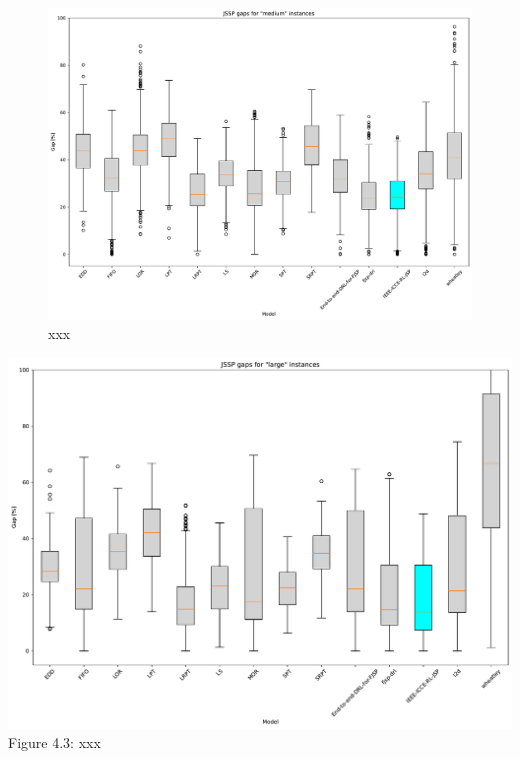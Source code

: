 \begin{figure}[htbp]
    \centering
    \includegraphics[width=\linewidth]{images/horizontal_boxplot_jssp_medium.pdf}
    \caption{xxx}
    \label{fig:boxplot_medium}
\end{figure}
\begin{center}
    \includegraphics[width=\linewidth]{images/horizontal_boxplot_jssp_large.pdf}\\
    Figure 4.3: xxx
\end{center}

